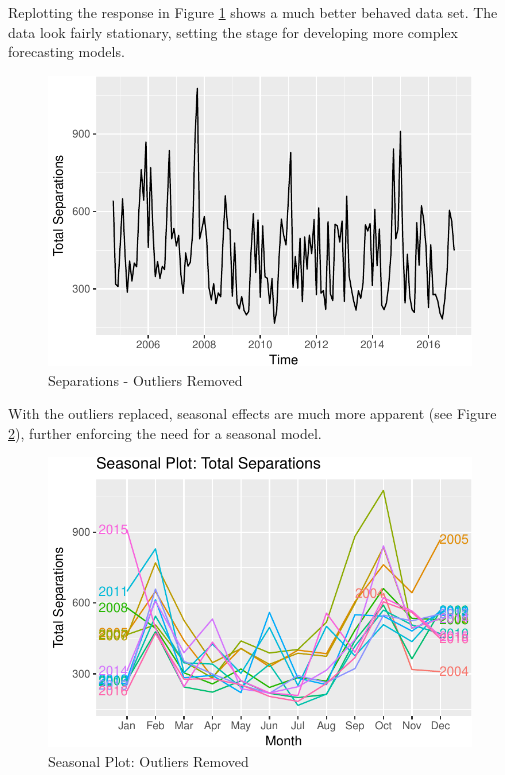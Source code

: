 \documentclass[12pt,letterpaper,toc=flat,oneside]{report}
\theoremstyle{definition}
\theoremstyle{definition}
\theoremstyle{definition}
\theoremstyle{remark}
\begin{document}
Replotting the response in Figure \ref{fig:response-plot-2} shows a much
better behaved data set. The data look fairly stationary, setting the
stage for developing more complex forecasting models.

\begin{figure}[H]

{\centering \includegraphics{elliott-econometric-personnel-retention-18_files/figure-latex/response-plot-2-1} 

}

\caption{Separations - Outliers Removed}\label{fig:response-plot-2}
\end{figure}

With the outliers replaced, seasonal effects are much more apparent (see
Figure \ref{fig:response-season-plot-2}), further enforcing the need for
a seasonal model.

\begin{figure}[H]

{\centering \includegraphics{elliott-econometric-personnel-retention-18_files/figure-latex/response-season-plot-2-1} 

}

\caption{Seasonal Plot: Outliers Removed}\label{fig:response-season-plot-2}
\end{figure}
\end{document}
